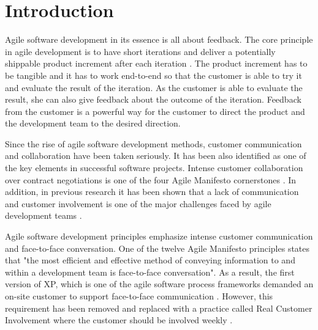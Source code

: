 \documentclass[english,12pt,a4paper,pdftex]{article}
\begin{document}
\cleardoublepage

\storeinipagenumber
{}
\setcounter{page}{1}

\clearpage

\section{Introduction}
\label{sec:introduction}
\acresetall

Agile software development in its essence is all about feedback. The core principle in agile development is to have short iterations and deliver a potentially shippable product increment after each iteration \citep{schwaber2009agile}. The product increment has to be tangible and it has to work end-to-end so that the customer is able to try it and evaluate the result of the iteration. As the customer is able to evaluate the result, she can also give feedback about the outcome of the iteration. Feedback from the customer is a powerful way for the customer to direct the product and the development team to the desired direction.

Since the rise of agile software development methods, customer communication and collaboration have been taken seriously. It has been also identified as one of the key elements in successful software projects. Intense customer collaboration over contract negotiations is one of the four Agile Manifesto cornerstones \citep{agilemanifesto}. In addition, in previous research it has been shown that a lack of communication and customer involvement is one of the major challenges faced by agile development teams \citep{korkala2006}.

Agile software development principles emphasize intense customer communication and face-to-face conversation. One of the twelve Agile Manifesto principles states that "the most efficient and effective method of conveying information to and within a development team is face-to-face conversation". \citep{agilemanifesto} As a result, the first version of \ac{XP}, which is one of the agile software process frameworks demanded an on-site customer to support face-to-face communication \citep{beck2004}. However, this requirement has been removed and replaced with a practice called Real Customer Involvement where the customer should be involved weekly \citep{korkala2006}.
\end{document}
